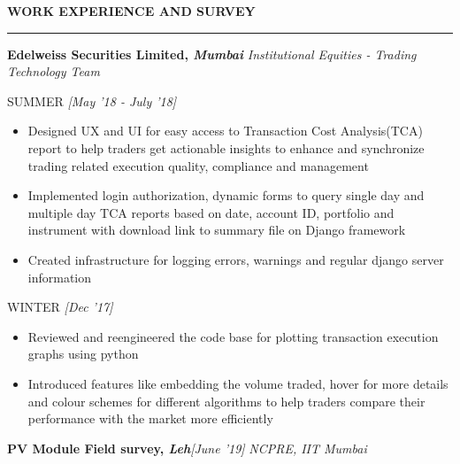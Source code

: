 \documentclass[10 pt]{article}%
\begin{document}
\vspace*{4.2cm}
\begin{flushleft}\textbf{\Large{\textcolor{bl}{WORK EXPERIENCE AND SURVEY}}}\end{flushleft}
\vspace{-5pt}
\hrule
\vspace{1 pt}
{\flushleft \textbf {\large{Edelweiss Securities Limited, \em{Mumbai}}}}
\vspace{-0.8em}
{\flushleft \em{Institutional Equities - Trading Technology Team}}
\vspace{-0.8em}
{\flushleft \textrm{SUMMER} \hfill {{{\em{[May '18 - July '18]}}}}\\
\vspace{-3mm}
\begin{itemize}[leftmargin=*]
    \setlength\itemsep{1.5pt}
    \setlength\parskip{1.5pt}
    \item Designed UX and UI for easy access to Transaction Cost Analysis(TCA) report to help traders get actionable insights to enhance and synchronize trading related execution quality, compliance and management
	\item Implemented login authorization, dynamic forms to query single day and multiple day TCA reports based on date, account ID, portfolio and instrument with download link to summary file on Django framework
	\item Created infrastructure for logging errors, warnings and regular django server information
\end{itemize}
{\flushleft \textrm{WINTER} \hfill {{{\em{[Dec '17]}}}}\\
\vspace{-2mm}
\begin{itemize}[leftmargin=*]
	\setlength\itemsep{1.5pt}
	\setlength\parskip{1.5pt}	
	\item Reviewed and reengineered the code base for plotting transaction execution graphs using python
	\item Introduced features like embedding the volume traded, hover for more details and colour schemes for different algorithms to help traders compare their performance with the market more efficiently
\end{itemize}
{\flushleft \bf {\large{PV Module Field survey,  \em{Leh}}}}\hfill {{{\em{[June '19]}}}}
\vspace{-0.8em}
{\flushleft \em{NCPRE, IIT Mumbai}}
\vspace{-5pt}
}}
\end{document}
